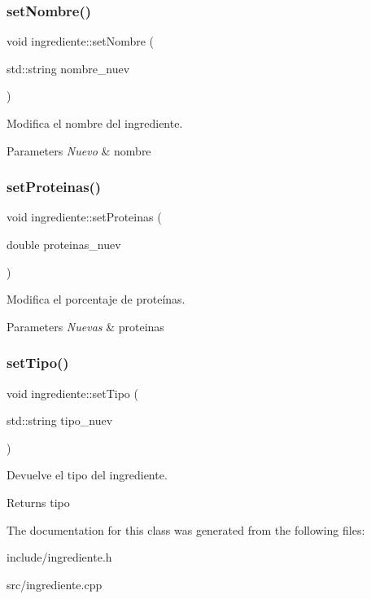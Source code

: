 \subsubsection{\texorpdfstring{set\+Nombre()}{setNombre()}}
{\footnotesize\ttfamily void ingrediente\+::set\+Nombre (\begin{DoxyParamCaption}\item[{std\+::string}]{nombre\+\_\+nuev }\end{DoxyParamCaption})}



Modifica el nombre del ingrediente. 


\begin{DoxyParams}{Parameters}
{\em Nuevo} & nombre \\
\hline
\end{DoxyParams}
\mbox{\label{classingrediente_a04afeb1b1b90b56a74ff9633d225157f}} 
\subsubsection{\texorpdfstring{set\+Proteinas()}{setProteinas()}}
{\footnotesize\ttfamily void ingrediente\+::set\+Proteinas (\begin{DoxyParamCaption}\item[{double}]{proteinas\+\_\+nuev }\end{DoxyParamCaption})}



Modifica el porcentaje de proteínas. 


\begin{DoxyParams}{Parameters}
{\em Nuevas} & proteinas \\
\hline
\end{DoxyParams}
\mbox{\label{classingrediente_a2bc30d0ced2ccdec801052d2141eaa32}} 
\subsubsection{\texorpdfstring{set\+Tipo()}{setTipo()}}
{\footnotesize\ttfamily void ingrediente\+::set\+Tipo (\begin{DoxyParamCaption}\item[{std\+::string}]{tipo\+\_\+nuev }\end{DoxyParamCaption})}



Devuelve el tipo del ingrediente. 

\begin{DoxyReturn}{Returns}
tipo 
\end{DoxyReturn}


The documentation for this class was generated from the following files\+:\begin{DoxyCompactItemize}
\item 
include/ingrediente.\+h\item 
src/ingrediente.\+cpp\end{DoxyCompactItemize}
